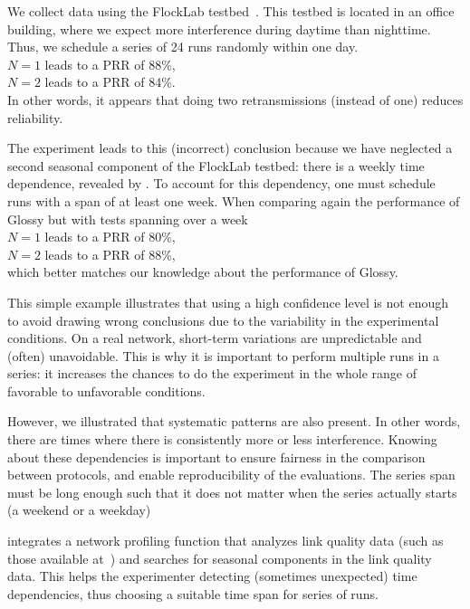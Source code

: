 We collect data using the FlockLab testbed~\cite{lim2013FlockLab}.
This testbed is located in an office building, where we expect more interference during daytime than nighttime.
Thus, we schedule a series of 24 runs randomly within one day.\\
  \inlineitem $N=1$ leads to a PRR of 88\%,\\
  \inlineitem $N=2$ leads to a PRR of 84\%.\\
In other words, it appears that doing two retransmissions (instead of one) reduces reliability.

The experiment leads to this (incorrect) conclusion because we have neglected a second seasonal component of the FlockLab testbed: there is a weekly time dependence, revealed by .
To account for this dependency, one must schedule runs with a span of at least one week. When comparing again the performance of Glossy but with tests spanning over a week\\
  \inlineitem $N=1$ leads to a PRR of 80\%,\\
  \inlineitem $N=2$ leads to a PRR of 88\%,\\
which better matches our knowledge about the performance of Glossy.

This simple example illustrates that using a high confidence level is not enough to avoid drawing wrong conclusions due to the variability in the experimental conditions.
On a real network, short-term variations are unpredictable and (often) unavoidable. This is why it is important to perform multiple runs in a series: it increases the chances to do the experiment in the whole range of favorable to unfavorable conditions.

However, we illustrated that systematic patterns are also present. In other words, there are times where there is consistently more or less interference. Knowing about these dependencies is important to
  ensure fairness in the comparison between protocols, and
  enable reproducibility of the evaluations.
The series span must be long enough such that it does not matter when the series actually starts (\eg a weekend or a weekday)

\triscale integrates a network profiling function that analyzes link quality data (such as those available at~\cite{jacob2019datasetLQE}) and searches for seasonal components in the link quality data. This helps the experimenter detecting (sometimes unexpected) time dependencies, thus choosing a suitable time span for series of runs.


